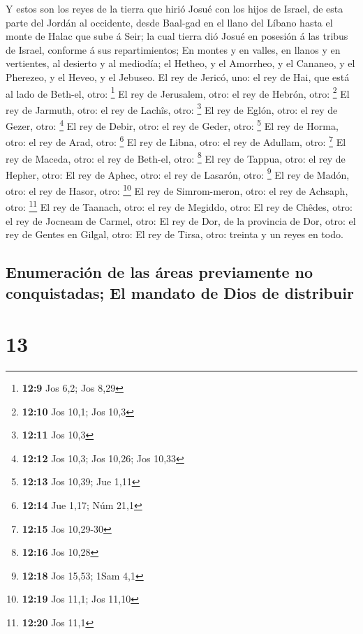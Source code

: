  Y estos son los reyes de la tierra que hirió Josué con los
hijos de Israel, de esta parte del Jordán al occidente, desde Baal-gad
en el llano del Líbano hasta el monte de Halac que sube á Seir; la cual
tierra dió Josué en posesión á las tribus de Israel, conforme á sus
repartimientos;  En montes y en valles, en llanos y en
vertientes, al desierto y al mediodía; el Hetheo, y el Amorrheo, y el
Cananeo, y el Pherezeo, y el Heveo, y el Jebuseo.  El rey de
Jericó, uno: el rey de Hai, que está al lado de Beth-el, otro:
\footnote{\textbf{12:9} Jos 6,2; Jos 8,29}  El rey de
Jerusalem, otro: el rey de Hebrón, otro: \footnote{\textbf{12:10} Jos
  10,1; Jos 10,3}  El rey de Jarmuth, otro: el rey de
Lachîs, otro: \footnote{\textbf{12:11} Jos 10,3}  El rey de
Eglón, otro: el rey de Gezer, otro: \footnote{\textbf{12:12} Jos 10,3;
  Jos 10,26; Jos 10,33}  El rey de Debir, otro: el rey de
Geder, otro: \footnote{\textbf{12:13} Jos 10,39; Jue 1,11} 
El rey de Horma, otro: el rey de Arad, otro: \footnote{\textbf{12:14}
  Jue 1,17; Núm 21,1}  El rey de Libna, otro: el rey de
Adullam, otro: \footnote{\textbf{12:15} Jos 10,29-30}  El
rey de Maceda, otro: el rey de Beth-el, otro: \footnote{\textbf{12:16}
  Jos 10,28}  El rey de Tappua, otro: el rey de Hepher,
otro:  El rey de Aphec, otro: el rey de Lasarón, otro:
\footnote{\textbf{12:18} Jos 15,53; 1Sam 4,1}  El rey de
Madón, otro: el rey de Hasor, otro: \footnote{\textbf{12:19} Jos 11,1;
  Jos 11,10}  El rey de Simrom-meron, otro: el rey de
Achsaph, otro: \footnote{\textbf{12:20} Jos 11,1}  El rey
de Taanach, otro: el rey de Megiddo, otro:  El rey de
Chêdes, otro: el rey de Jocneam de Carmel, otro:  El rey de
Dor, de la provincia de Dor, otro: el rey de Gentes en Gilgal, otro:
 El rey de Tirsa, otro: treinta y un reyes en todo.

\hypertarget{enumeraciuxf3n-de-las-uxe1reas-previamente-no-conquistadas-el-mandato-de-dios-de-distribuir}{%
\subsection{Enumeración de las áreas previamente no conquistadas; El
mandato de Dios de
distribuir}\label{enumeraciuxf3n-de-las-uxe1reas-previamente-no-conquistadas-el-mandato-de-dios-de-distribuir}}

\hypertarget{section-12}{%
\section{13}\label{section-12}}

